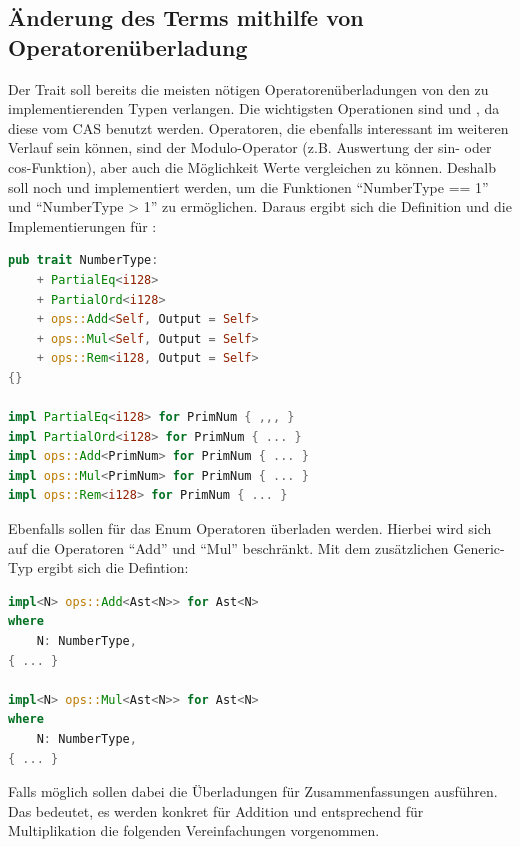 \documentclass[11pt,a4paper, ngerman]{article}
\begin{document}
\subsection{Änderung des Terms mithilfe von Operatorenüberladung}
Der Trait  soll bereits die meisten nötigen Operatorenüberladungen von den zu implementierenden Typen verlangen. Die wichtigsten Operationen sind  und , da diese vom CAS benutzt werden. Operatoren, die ebenfalls interessant im weiteren Verlauf sein können, sind der Modulo-Operator  (z.B. Auswertung der sin- oder cos-Funktion), aber auch die Möglichkeit Werte vergleichen zu können. Deshalb soll noch  und  implementiert werden, um die Funktionen ``NumberType == 1'' und ``NumberType > 1'' zu ermöglichen. Daraus ergibt sich die Definition und die Implementierungen für :

\begin{lstlisting}[language=rust, caption={trait NumberType 1. Iteration}]
pub trait NumberType:
    + PartialEq<i128>
    + PartialOrd<i128>
    + ops::Add<Self, Output = Self>
    + ops::Mul<Self, Output = Self>
    + ops::Rem<i128, Output = Self>
{}

impl PartialEq<i128> for PrimNum { ,,, }
impl PartialOrd<i128> for PrimNum { ... }
impl ops::Add<PrimNum> for PrimNum { ... }
impl ops::Mul<PrimNum> for PrimNum { ... }
impl ops::Rem<i128> for PrimNum { ... }
\end{lstlisting}

Ebenfalls sollen für das Enum  Operatoren überladen werden. Hierbei wird sich auf die Operatoren ``Add'' und ``Mul'' beschränkt. Mit dem zusätzlichen Generic-Typ ergibt sich die Defintion:

\begin{lstlisting}[language=rust, caption={Ast Operatorenüberladung}]
impl<N> ops::Add<Ast<N>> for Ast<N>
where
    N: NumberType,
{ ... }

impl<N> ops::Mul<Ast<N>> for Ast<N>
where
    N: NumberType,
{ ... }
\end{lstlisting}

Falls möglich sollen dabei die Überladungen für  Zusammenfassungen ausführen. Das bedeutet, es werden konkret für Addition und entsprechend für Multiplikation die folgenden Vereinfachungen vorgenommen.
\end{document}
